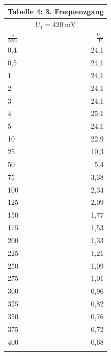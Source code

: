 \documentclass{scrartcl}
\begin{document}
\begin{minipage}{0.6\textwidth}
\begin{tabular}{@{}lr@{}}
 \multicolumn{2}{c}{Tabelle 4: 3. Frequenzgang} \\

    \toprule
    \multicolumn{2}{c}{$U_1 = \SI{420}{\milli \volt}$} \\
    \cmidrule(r){1-2}
    $\frac{\nu}{kHz}$ & $\frac{U_A}{V}$ \\
    \midrule
    0,4 & 24,1 \\
    0,5  &  24,1 \\
    1 & 24,1 \\
    2 & 24,1 \\
    3 &  24,1 \\
    4 & 25,1 \\
    5 & 24,1 \\
    10 & 22,9 \\
     25 & 10,3 \\
     50 & 5,4 \\
     75 & 3,38 \\
     100 & 2,34 \\
     125 & 2,09 \\
     150 & 1,77 \\
     175 & 1,53 \\
     200 & 1,33 \\
     225 & 1,21 \\
     250 & 1,09 \\
     275 & 1,01 \\
     300 & 0,96 \\
     325 & 0,82 \\
     350 & 0,76 \\
     375 & 0,72 \\
     400 & 0,68 \\
     \bottomrule
      \\

\end{tabular}
\end{minipage}
\end{document}
